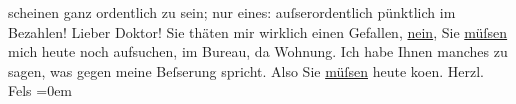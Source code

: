\begin{ledgroupsized}[t]{13cm}
               scheinen ganz ordentlich zu sein; nur eines: auſserordentlich pünktlich im
               Bezahlen!\pend
           \pstart
           Lieber Doktor! Sie thäten mir wirklich einen Gefallen, \uline{nein}, Sie \uline{müſsen} mich heute noch aufsuchen,
               im Bureau, da{\geminationn} Wohnung. Ich habe Ihnen manches zu sagen,
               was gegen meine Beſserung spricht. Also Sie \uline{müſsen}
               heute ko{\geminationm}en.\pend
           \pstart
           Herzl.{\\[\baselineskip]}\spacefill\mbox{Fels}\pend
           \leftskip=0em{}\endnumbering{}\end{ledgroupsized}  \newcommand{\dateiname}{L00153}\newcommand{\titel}{Friedrich M. Fels an Arthur Schnitzler, [1. 1. 1893?]}\newcommand{\editorInnen}{Martin Anton Müller und Gerd-Hermann Susen}
      